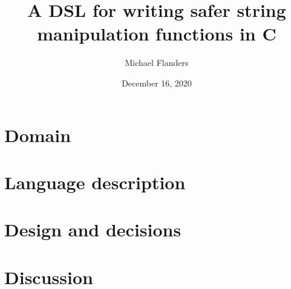 \documentclass[letterpaper]{article}
\title{A DSL for writing safer string manipulation functions in C}
\author{Michael Flanders}
\date{December 16, 2020}
\begin{document}
\maketitle


\section{Domain}


\section{Language description}


\section{Design and decisions}


\section{Discussion}

\end{document}
